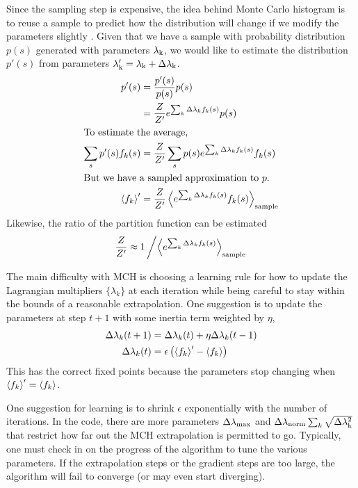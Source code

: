 \documentclass[aps,prl,twocolumn]{revtex4-1}
\begin{document}
Since the sampling step is expensive, the idea behind Monte Carlo histogram is to reuse a sample to predict how the distribution will change if we modify the parameters slightly \cite{Broderick:2007wq}. Given that we have a sample with probability distribution $p(s)$ generated with parameters $\lambda_{\rm k}$, we would like to estimate the distribution $p'(s)$ from parameters $\lambda_{\rm k}' = \lambda_{\rm k}+\Delta\lambda_{\rm k}$.
\begin{align}
	p'(s) &= \frac{p'(s)}{p(s)}p(s)\\
		&= \frac{Z}{Z'}e^{\sum_k \Delta\lambda_k f_k(s)} p(s)\\
\intertext{To estimate the average,}
	\sum_s p'(s) f_k(s) &= \frac{Z}{Z'} \sum_s p(s) e^{\sum_k \Delta\lambda_k f_k(s)} f_k(s)\\
\intertext{But we have a sampled approximation to $p$.}
	\left<f_k\right>' &= \frac{Z}{Z'} \left<e^{\sum_k \Delta\lambda_k f_k(s)} f_k(s)\right>_{\rm sample}
\end{align}
Likewise, the ratio of the partition function can be estimated
\begin{align}
	\frac{Z}{Z'} \approx 1\left/\left<e^{\sum_k \Delta\lambda_k f_k(s)}\right>_{\rm sample}\right.
\end{align}

The main difficulty with MCH is choosing a learning rule for how to update the Lagrangian multipliers $\{\lambda_k\}$ at each iteration while being careful to stay within the bounds of a reasonable extrapolation. One suggestion is to update the parameters at step $t+1$ with some inertia term weighted by $\eta$,
\begin{align}
	\Delta\lambda_k(t+1) &= \Delta \lambda_k(t) + \eta \Delta\lambda_k(t-1)\label{eq:mch learn1}\\
	\Delta \lambda_k(t) &= \epsilon\left(\left<f_k\right>'-\left<f_k\right>\right)\label{eq:mch learn2}
\end{align}
This has the correct fixed points because the parameters stop changing when $\left<f_k\right>'=\left<f_k\right>$.

One suggestion for learning is to shrink $\epsilon$ exponentially with the number of iterations. In the code, there are more parameters $\Delta\lambda_{\rm max}$ and $\Delta\lambda_{\rm norm}\sum_k \sqrt{\Delta\lambda_{\rm k}^2}$ that restrict how far out the MCH extrapolation is permitted to go.
Typically, one must check in on the progress of the algorithm to tune the various parameters. If the extrapolation steps or the gradient steps are too large, the algorithm will fail to converge (or may even start diverging).
\end{document}
